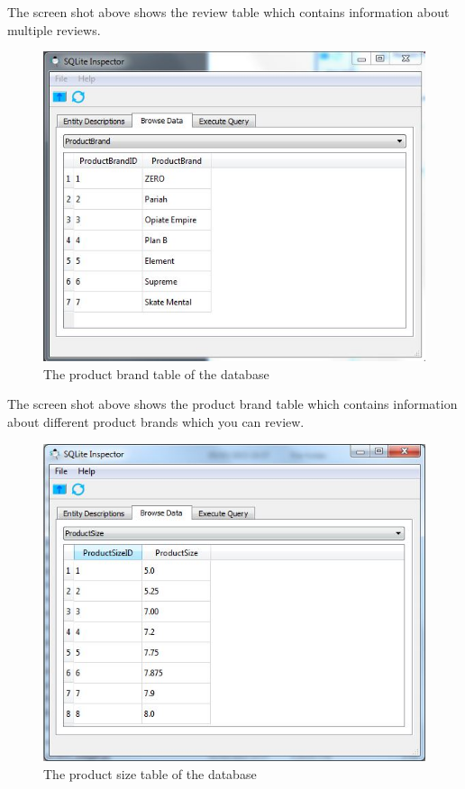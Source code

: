 The screen shot above shows the review table which contains information about multiple reviews.

\begin{figure}[H]
    \includegraphics[width=\textwidth]{./Maintenance/Figures/ProductBrandTable.jpg}
    \caption{The product brand table of the database} \label{fig:ProductBrand Table}
\end{figure}

The screen shot above shows the product brand table which contains information about different product brands which you can review.

\begin{figure}[H]
    \includegraphics[width=\textwidth]{./Maintenance/Figures/ProductSizeTable.jpg}
    \caption{The product size table of the database} \label{fig:ProductSize Table}
\end{figure}


